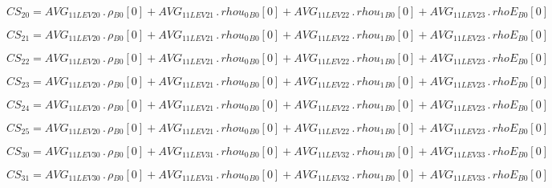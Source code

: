 \documentclass{article}
\begin{document}
\begin{dmath}CS_{20} = AVG_{1 1 LEV 20} \,.\, {\rho{_{B0}}}[{0}] + AVG_{1 1 LEV 21} \,.\, {rhou_{0}{_{B0}}}[{0}] + AVG_{1 1 LEV 22} \,.\, {rhou_{1}{_{B0}}}[{0}] + AVG_{1 1 LEV 23} \,.\, {rhoE{_{B0}}}[{0}]\end{dmath}

\begin{dmath}CS_{21} = AVG_{1 1 LEV 20} \,.\, {\rho{_{B0}}}[{0}] + AVG_{1 1 LEV 21} \,.\, {rhou_{0}{_{B0}}}[{0}] + AVG_{1 1 LEV 22} \,.\, {rhou_{1}{_{B0}}}[{0}] + AVG_{1 1 LEV 23} \,.\, {rhoE{_{B0}}}[{0}]\end{dmath}

\begin{dmath}CS_{22} = AVG_{1 1 LEV 20} \,.\, {\rho{_{B0}}}[{0}] + AVG_{1 1 LEV 21} \,.\, {rhou_{0}{_{B0}}}[{0}] + AVG_{1 1 LEV 22} \,.\, {rhou_{1}{_{B0}}}[{0}] + AVG_{1 1 LEV 23} \,.\, {rhoE{_{B0}}}[{0}]\end{dmath}

\begin{dmath}CS_{23} = AVG_{1 1 LEV 20} \,.\, {\rho{_{B0}}}[{0}] + AVG_{1 1 LEV 21} \,.\, {rhou_{0}{_{B0}}}[{0}] + AVG_{1 1 LEV 22} \,.\, {rhou_{1}{_{B0}}}[{0}] + AVG_{1 1 LEV 23} \,.\, {rhoE{_{B0}}}[{0}]\end{dmath}

\begin{dmath}CS_{24} = AVG_{1 1 LEV 20} \,.\, {\rho{_{B0}}}[{0}] + AVG_{1 1 LEV 21} \,.\, {rhou_{0}{_{B0}}}[{0}] + AVG_{1 1 LEV 22} \,.\, {rhou_{1}{_{B0}}}[{0}] + AVG_{1 1 LEV 23} \,.\, {rhoE{_{B0}}}[{0}]\end{dmath}

\begin{dmath}CS_{25} = AVG_{1 1 LEV 20} \,.\, {\rho{_{B0}}}[{0}] + AVG_{1 1 LEV 21} \,.\, {rhou_{0}{_{B0}}}[{0}] + AVG_{1 1 LEV 22} \,.\, {rhou_{1}{_{B0}}}[{0}] + AVG_{1 1 LEV 23} \,.\, {rhoE{_{B0}}}[{0}]\end{dmath}

\begin{dmath}CS_{30} = AVG_{1 1 LEV 30} \,.\, {\rho{_{B0}}}[{0}] + AVG_{1 1 LEV 31} \,.\, {rhou_{0}{_{B0}}}[{0}] + AVG_{1 1 LEV 32} \,.\, {rhou_{1}{_{B0}}}[{0}] + AVG_{1 1 LEV 33} \,.\, {rhoE{_{B0}}}[{0}]\end{dmath}

\begin{dmath}CS_{31} = AVG_{1 1 LEV 30} \,.\, {\rho{_{B0}}}[{0}] + AVG_{1 1 LEV 31} \,.\, {rhou_{0}{_{B0}}}[{0}] + AVG_{1 1 LEV 32} \,.\, {rhou_{1}{_{B0}}}[{0}] + AVG_{1 1 LEV 33} \,.\, {rhoE{_{B0}}}[{0}]\end{dmath}
\end{document}
